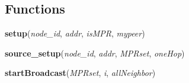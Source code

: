   \subsection{Functions}

    \label{broadCast:setup}

    \vspace{0.5ex}

\hspace{.8\funcindent}\begin{boxedminipage}{\funcwidth}

    \raggedright \textbf{setup}(\textit{node\_id}, \textit{addr}, \textit{isMPR}, \textit{mypeer})

\setlength{\parskip}{2ex}
\setlength{\parskip}{1ex}
    \end{boxedminipage}

    \label{broadCast:source_setup}

    \vspace{0.5ex}

\hspace{.8\funcindent}\begin{boxedminipage}{\funcwidth}

    \raggedright \textbf{source\_setup}(\textit{node\_id}, \textit{addr}, \textit{MPRset}, \textit{oneHop})

\setlength{\parskip}{2ex}
\setlength{\parskip}{1ex}
    \end{boxedminipage}

    \label{broadCast:startBroadcast}

    \vspace{0.5ex}

\hspace{.8\funcindent}\begin{boxedminipage}{\funcwidth}

    \raggedright \textbf{startBroadcast}(\textit{MPRset}, \textit{i}, \textit{allNeighbor})

\setlength{\parskip}{2ex}
\setlength{\parskip}{1ex}
    \end{boxedminipage}



